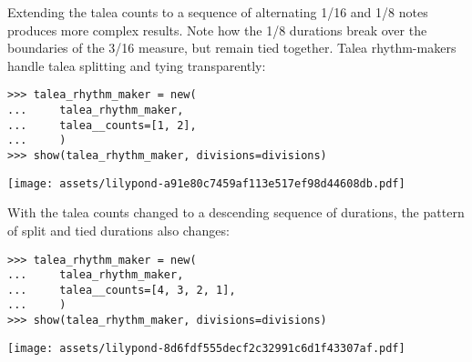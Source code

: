 \noindent Extending the talea counts to a sequence of alternating 1/16 and 1/8
notes produces more complex results. Note how the 1/8 durations break over the
boundaries of the 3/16 measure, but remain tied together. Talea rhythm-makers
handle talea splitting and tying transparently:

\begin{comment}
<abjad>
talea_rhythm_maker = new(
    talea_rhythm_maker,
    talea__counts=[1, 2],
    )
show(talea_rhythm_maker, divisions=divisions)
</abjad>
\end{comment}

\begin{abjadbookoutput}
\begin{singlespacing}
\vspace{-0.5\baselineskip}
\begin{verbatim}
>>> talea_rhythm_maker = new(
...     talea_rhythm_maker,
...     talea__counts=[1, 2],
...     )
>>> show(talea_rhythm_maker, divisions=divisions)
\end{verbatim}
\noindent\texttt{[image: assets/lilypond-a91e80c7459af113e517ef98d44608db.pdf]}
\end{singlespacing}
\end{abjadbookoutput}

\noindent With the talea counts changed to a descending sequence of durations,
the pattern of split and tied durations also changes:

\begin{comment}
<abjad>
talea_rhythm_maker = new(
    talea_rhythm_maker,
    talea__counts=[4, 3, 2, 1],
    )
show(talea_rhythm_maker, divisions=divisions)
</abjad>
\end{comment}

\begin{abjadbookoutput}
\begin{singlespacing}
\vspace{-0.5\baselineskip}
\begin{verbatim}
>>> talea_rhythm_maker = new(
...     talea_rhythm_maker,
...     talea__counts=[4, 3, 2, 1],
...     )
>>> show(talea_rhythm_maker, divisions=divisions)
\end{verbatim}
\noindent\texttt{[image: assets/lilypond-8d6fdf555decf2c32991c6d1f43307af.pdf]}
\end{singlespacing}
\end{abjadbookoutput}

